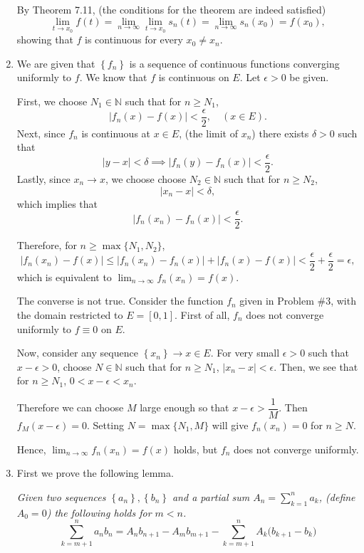 \documentclass[12pt]{report}
\newcommand{\numl}[1]{\item[\large\textbf{\sffamily #1.}]}
\newcommand{\ds}{\displaystyle}
\newcommand{\abs}[1]{\left| #1 \right|}
\newcommand{\seq}[1]{\left\{ #1 \right\}}
\newcommand{\ra}{\rightarrow}
\newcommand{\N}{\mathbb{N}}
\begin{document}
\begin{enumerate}
    By {\sffamily Theorem 7.11}, (the conditions for the theorem are indeed satisfied)
    \[
        \lim_{t \ra x_0} f(t) = \lim_{n\ra\infty} \lim_{t \ra x_0} s_n(t) = \lim_{n\ra\infty} s_n(x_0) = f(x_0),
    \]
    showing that \(f\) is continuous for every \(x_0 \neq x_n\).

    \numl{7} We are given that \(\seq{f_n}\) is a sequence of continuous functions converging uniformly to \(f\). We know that \(f\) is continuous on \(E\). Let \(\epsilon > 0\) be given.

    First, we choose \(N_1 \in \N\) such that for \(n \geq N_1\),
    \[
        \abs{f_n(x) - f(x)} < \frac{\epsilon}{2}, \quad (x \in E).
    \]
    Next, since \(f_n\) is continuous at \(x \in E\), (the limit of \(x_n\)) there exists \(\delta > 0\) such that
    \[
        \abs{y - x} < \delta \implies \abs{f_n(y) - f_n(x)} < \frac{\epsilon}{2}.
    \]
    Lastly, since \(x_n \ra x\), we choose choose \(N_2 \in \N\) such that for \(n \geq N_2\),
    \[
        \abs{x_n - x} < \delta,
    \]
    which implies that
    \[
        \abs{f_n(x_n) - f_n(x)} < \frac{\epsilon}{2}.
    \]

    Therefore, for \(n \geq \max\{N_1, N_2\}\),
    \[
        \abs{f_n(x_n) - f(x)} \leq \abs{f_n(x_n) - f_n(x)} + \abs{f_n(x) - f(x)} < \frac{\epsilon}{2} + \frac{\epsilon}{2} = \epsilon,
    \]
    which is equivalent to \(\ds \lim_{n\ra\infty} f_n(x_n) = f(x)\).

    The converse is not true. Consider the function \(f_n\) given in {\sffamily Problem \#3}, with the domain restricted to \(E = [0, 1]\). First of all, \(f_n\) does not converge uniformly to \(f \equiv 0\) on \(E\).

    Now, consider any sequence \(\seq{x_n} \ra x \in E\). For very small \(\epsilon > 0\) such that \(x - \epsilon > 0\), choose \(N \in \N\) such that for \(n \geq N_1\), \(\abs{x_n - x} < \epsilon\). Then, we see that for \(n \geq N_1\), \(0 < x - \epsilon < x_n\).

    Therefore we can choose \(M\) large enough so that \(x - \epsilon > \dfrac{1}{M}\). Then \(f_M(x - \epsilon) = 0\). Setting \(N = \max\{N_1, M\}\) will give \(f_n(x_n) = 0\) for \(n \geq N\).

    Hence, \(\ds \lim_{n\ra\infty} f_n(x_n) = f(x)\) holds, but \(f_n\) does not converge uniformly.


    \numl{8} First we prove the following lemma.

     \textit{Given two sequences \(\seq{a_n}, \seq{b_n}\) and a partial sum \(A_n = \ds\sum_{k=1}^n a_k\), (define \(A_0 = 0\)) the following holds for \(m < n\).
        \begin{equation} \tag{\textasteriskcentered}
            \sum_{k=m+1}^n a_n b_n = A_n b_{n+1} - A_m b_{m+1} - \sum_{k=m+1}^n A_k \bigl(b_{k+1} - b_k\bigr)
        \end{equation}
    }


\end{enumerate}
\end{document}
